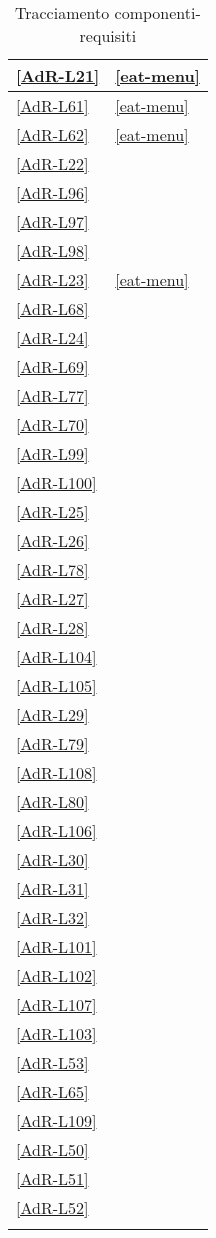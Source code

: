 \begin{longtable}{|>{\centering}P{5cm}|>{\centering}P{7cm}|}
	\hline \ref{AdR-L21} &  \linebreak \ref{eat-menu} \tabularnewline %
	\hline \ref{AdR-L61} &  \linebreak \ref{eat-menu} \tabularnewline
	\hline \ref{AdR-L62} &  \linebreak \ref{eat-menu} \tabularnewline
	\hline \ref{AdR-L22} &  \tabularnewline
	\hline \ref{AdR-L96} &  \tabularnewline
	\hline \ref{AdR-L97} &  \tabularnewline %
	\hline \ref{AdR-L98} &  \tabularnewline
	\hline \ref{AdR-L23} &  \linebreak \ref{eat-menu} \tabularnewline
	\hline \ref{AdR-L68} &  \tabularnewline
	\hline \ref{AdR-L24} &  \tabularnewline
	\hline \ref{AdR-L69} &  \tabularnewline %
	\hline \ref{AdR-L77} &  \tabularnewline
	\hline \ref{AdR-L70} &  \tabularnewline
	\hline \ref{AdR-L99} &  \tabularnewline
	\hline \ref{AdR-L100} &  \tabularnewline
	\hline \ref{AdR-L25} &  \tabularnewline %
	\hline \ref{AdR-L26} &  \tabularnewline
	\hline \ref{AdR-L78} &  \tabularnewline
	\hline \ref{AdR-L27} &  \tabularnewline
	\hline \ref{AdR-L28} &  \tabularnewline
	\hline \ref{AdR-L104} &  \tabularnewline %
	\hline \ref{AdR-L105} &  \tabularnewline
	\hline \ref{AdR-L29} &  \tabularnewline
	\hline \ref{AdR-L79} &  \tabularnewline
	\hline \ref{AdR-L108} &  \tabularnewline
	\hline \ref{AdR-L80} &  \tabularnewline %
	\hline \ref{AdR-L106} &  \tabularnewline
	\hline \ref{AdR-L30} &  \tabularnewline
	\hline \ref{AdR-L31} &  \tabularnewline
	\hline \ref{AdR-L32} &  \tabularnewline
	\hline \ref{AdR-L101} &  \tabularnewline %
	\hline \ref{AdR-L102} &  \tabularnewline
	\hline \ref{AdR-L107} &  \tabularnewline
	\hline \ref{AdR-L103} &  \tabularnewline
	\hline \ref{AdR-L53} &  \tabularnewline
	\hline \ref{AdR-L65} &  \tabularnewline %
	\hline \ref{AdR-L109} &  \tabularnewline
	\hline \ref{AdR-L50} &  \tabularnewline
	\hline \ref{AdR-L51} &  \tabularnewline
	\hline \ref{AdR-L52} &  \tabularnewline %
	
	\hline
	\caption{Tracciamento componenti-requisiti}
\end{longtable}

